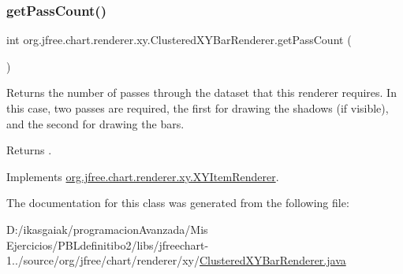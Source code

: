 \subsubsection{\texorpdfstring{get\+Pass\+Count()}{getPassCount()}}
{\footnotesize\ttfamily int org.\+jfree.\+chart.\+renderer.\+xy.\+Clustered\+X\+Y\+Bar\+Renderer.\+get\+Pass\+Count (\begin{DoxyParamCaption}{ }\end{DoxyParamCaption})}

Returns the number of passes through the dataset that this renderer requires. In this case, two passes are required, the first for drawing the shadows (if visible), and the second for drawing the bars.

\begin{DoxyReturn}{Returns}
{}. 
\end{DoxyReturn}


Implements \mbox{\hyperlink{interfaceorg_1_1jfree_1_1chart_1_1renderer_1_1xy_1_1_x_y_item_renderer_afe42489776da2a4c7e64838382bbaea1}{org.\+jfree.\+chart.\+renderer.\+xy.\+X\+Y\+Item\+Renderer}}.



The documentation for this class was generated from the following file\+:\begin{DoxyCompactItemize}
\item 
D\+:/ikasgaiak/programacion\+Avanzada/\+Mis Ejercicios/\+P\+B\+Ldefinitibo2/libs/jfreechart-\/1../source/org/jfree/chart/renderer/xy/\mbox{\hyperlink{_clustered_x_y_bar_renderer_8java}{Clustered\+X\+Y\+Bar\+Renderer.\+java}}\end{DoxyCompactItemize}
